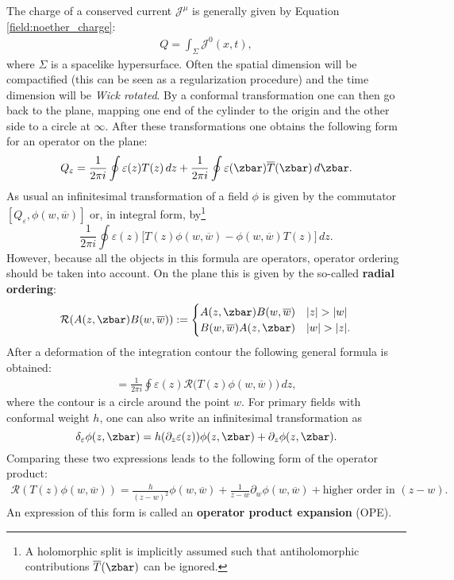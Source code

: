     The charge of a conserved current $\mathcal{J}^\mu$ is generally given by Equation \eqref{field:noether_charge}:
    \begin{gather}
        Q = \int_\Sigma\mathcal{J}^0(x,t),
    \end{gather}
    where $\Sigma$ is a spacelike hypersurface. Often the spatial dimension will be compactified (this can be seen as a regularization procedure) and the time dimension will be \textit{Wick rotated}. By a conformal transformation one can then go back to the plane, mapping one end of the cylinder to the origin and the other side to a circle at $\infty$. After these transformations one obtains the following form for an operator on the plane:
    \begin{gather}
        Q_\varepsilon = \frac{1}{2\pi i}\oint\varepsilon(z)T(z)\,dz + \frac{1}{2\pi i}\oint\varepsilon(\zbar)\overline{T}(\zbar)\,d\zbar.
    \end{gather}
    As usual an infinitesimal transformation of a field $\phi$ is given by the commutator $[Q_\varepsilon,\phi(w,\overline{w})]$ or, in integral form, by\footnote{A holomorphic split is implicitly assumed such that antiholomorphic contributions $\overline{T}(\zbar)$ can be ignored.} \[\frac{1}{2\pi i}\oint\varepsilon(z)\big[T(z)\phi(w,\overline{w}) - \phi(w,\overline{w})T(z)\big]\,dz.\] However, because all the objects in this formula are operators, operator ordering should be taken into account. On the plane this is given by the so-called \textbf{radial ordering}:
    \begin{gather}
        \mathcal{R}(A(z,\zbar)B(w,\overline{w})) :=
        \begin{cases}
            A(z,\zbar)B(w,\overline{w})&|z|>|w|\\
            B(w,\overline{w})A(z,\zbar)&|w|>|z|.
        \end{cases}
    \end{gather}
    After a deformation of the integration contour the following general formula is obtained:
    \begin{gather}
        [Q_\varepsilon,\phi(w,\overline{w})] = \frac{1}{2\pi i}\oint\varepsilon(z)\mathcal{R}\big(T(z)\phi(w,\overline{w})\big)\,dz,
    \end{gather}
    where the contour is a circle around the point $w$. For primary fields with conformal weight $h$, one can also write an infinitesimal transformation as \[\delta_\varepsilon\phi(z,\zbar) = h(\partial_z\varepsilon(z))\phi(z,\zbar) + \partial_z\phi(z,\zbar).\] Comparing these two expressions leads to the following form of the operator product:
    \begin{gather}
        \mathcal{R}(T(z)\phi(w,\overline{w})) = \frac{h}{(z-w)^2}\phi(w,\overline{w}) + \frac{1}{z-w}\partial_w\phi(w,\overline{w}) + \text{higher order in } (z-w).
    \end{gather}
    An expression of this form is called an \textbf{operator product expansion} (OPE).

